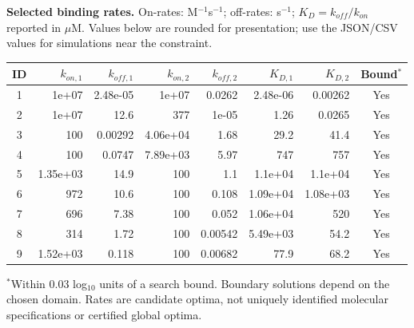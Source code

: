 \documentclass[10pt,a4paper]{article}
\begin{document}
\textbf{Selected binding rates.} On-rates: M$^{-1}$s$^{-1}$; off-rates: s$^{-1}$; $K_D=k_{off}/k_{on}$ reported in $\mu$M. Values below are rounded for presentation; use the JSON/CSV values for simulations near the constraint.
\begin{center}\small\begin{tabular}{crrrrrrc}\toprule
ID & $k_{on,1}$ & $k_{off,1}$ & $k_{on,2}$ & $k_{off,2}$ & $K_{D,1}$ & $K_{D,2}$ & Bound$^*$\\\midrule
1 & 1e+07 & 2.48e-05 & 1e+07 & 0.0262 & 2.48e-06 & 0.00262 & Yes \\
2 & 1e+07 & 12.6 & 377 & 1e-05 & 1.26 & 0.0265 & Yes \\
3 & 100 & 0.00292 & 4.06e+04 & 1.68 & 29.2 & 41.4 & Yes \\
4 & 100 & 0.0747 & 7.89e+03 & 5.97 & 747 & 757 & Yes \\
5 & 1.35e+03 & 14.9 & 100 & 1.1 & 1.1e+04 & 1.1e+04 & Yes \\
6 & 972 & 10.6 & 100 & 0.108 & 1.09e+04 & 1.08e+03 & Yes \\
7 & 696 & 7.38 & 100 & 0.052 & 1.06e+04 & 520 & Yes \\
8 & 314 & 1.72 & 100 & 0.00542 & 5.49e+03 & 54.2 & Yes \\
9 & 1.52e+03 & 0.118 & 100 & 0.00682 & 77.9 & 68.2 & Yes \\
\bottomrule\end{tabular}\end{center}
$^*$Within 0.03 log$_{10}$ units of a search bound. Boundary solutions depend on the chosen domain. Rates are candidate optima, not uniquely identified molecular specifications or certified global optima.
\newpage
\end{document}
